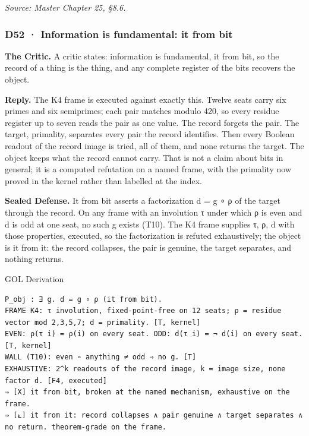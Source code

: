 \documentclass[10pt,twocolumn]{article}
\begin{document}
\emph{Source: Master Chapter 25, §8.6.}

\hypertarget{d52-information-is-fundamental-it-from-bit}{%
\subsubsection{D52 · Information is fundamental: it from
bit}\label{d52-information-is-fundamental-it-from-bit}}

\textbf{The Critic.} A critic states: information is fundamental, it
from bit, so the record of a thing is the thing, and any complete
register of the bits recovers the object.

\textbf{Reply.} The K4 frame is executed against exactly this. Twelve
seats carry six primes and six semiprimes; each pair matches modulo 420,
so every residue register up to seven reads the pair as one value. The
record forgets the pair. The target, primality, separates every pair the
record identifies. Then every Boolean readout of the record image is
tried, all of them, and none returns the target. The object keeps what
the record cannot carry. That is not a claim about bits in general; it
is a computed refutation on a named frame, with the primality now proved
in the kernel rather than labelled at the index.

\textbf{Sealed Defense.} It from bit asserts a factorization d = g ∘ ρ
of the target through the record. On any frame with an involution τ
under which ρ is even and d is odd at one seat, no such g exists (T10).
The K4 frame supplies τ, ρ, d with those properties, executed, so the
factorization is refuted exhaustively; the object is it from it: the
record collapses, the pair is genuine, the target separates, and nothing
returns.

\begin{golbox}{GOL Derivation}
\begin{lstlisting}[style=golv]
P_obj : ∃ g. d = g ∘ ρ (it from bit).
FRAME K4: τ involution, fixed-point-free on 12 seats; ρ = residue vector mod 2,3,5,7; d = primality. [T, kernel]
EVEN: ρ(τ i) = ρ(i) on every seat. ODD: d(τ i) = ¬ d(i) on every seat. [T, kernel]
WALL (T10): even ∘ anything ≠ odd ⇒ no g. [T]
EXHAUSTIVE: 2^k readouts of the record image, k = image size, none factor d. [F4, executed]
⇒ [X] it from bit, broken at the named mechanism, exhaustive on the frame.
⇒ [⟀] it from it: record collapses ∧ pair genuine ∧ target separates ∧ no return. theorem-grade on the frame.
\end{lstlisting}
\end{golbox}
\end{document}

